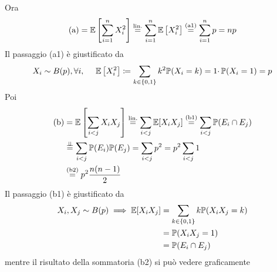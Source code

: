 \begin{enumerate}
Ora
\begin{equation*}
\text{(a)} =\EE\left[\sum\limits _{i=1}^{n} X_{i}^{2}\right]\overset{\text{lin.}}{=}\sum\limits _{i=1}^{n}\EE\left[ X_{i}^{2}\right]\overset{\text{(a1)}}{=}\sum\limits _{i=1}^{n} p=np
\end{equation*}
Il passaggio (a1) è giustificato da
\begin{equation*}
X_{i} \sim B( p) ,\forall i,\ \ \ \ \EE\left[ X_{i}^{2}\right] \coloneqq \sum\limits _{k\in \{0,1\}} k^{2}\PP( X_{i} =k) =1\cdotp \PP( X_{i} =1) =p
\end{equation*}
Poi
\begin{align*}
\text{(b)} & =\EE\left[\sum\limits _{i< j} X_{i} X_{j}\right]\overset{\text{lin.}}{=}\sum\limits _{i< j} \EE[ X_{i} X_{j}]\overset{\text{(b1)}}{=}\sum\limits _{i< j}\PP( E_{i} \cap E_{j})\\
 & \overset{\Bot }{=}\sum\limits _{i< j}\PP( E_{i})\PP( E_{j}) =\sum\limits _{i< j} p^{2} =p^{2}\sum\limits _{i< j} 1\\
 & \overset{\text{(b2)}}{=} p^{2}\frac{n( n-1)}{2}
\end{align*}
Il passaggio (b1) è giustificato da
\begin{align*}
X_{i} ,X_{j} \sim B( p) \implies \EE[ X_{i} X_{j}] & =\sum\limits _{k\in \{0,1\}} k\PP( X_{i} X_{j} =k)\\
 & =\PP( X_{i} X_{j} =1)\\
 & =\PP( E_{i} \cap E_{j})
\end{align*}
mentre il risultato della sommatoria (b2) si può vedere graficamente

 
\tikzset{
pattern size/.store in=\mcSize, 
pattern size = 5pt,
pattern thickness/.store in=\mcThickness, 
pattern thickness = 0.3pt,
pattern radius/.store in=\mcRadius, 
pattern radius = 1pt}\makeatletter
{}
\makeatother
{} %

\begin{tikzpicture}[x=0.75pt,y=0.75pt,yscale=-1,xscale=1]


\end{tikzpicture}
\end{enumerate}
